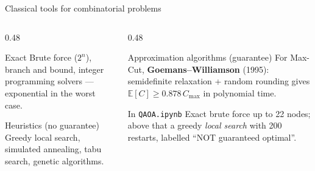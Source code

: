 \documentclass[aspectratio=169,11pt]{beamer}
\newcommand{\key}[1]{{\color{qdark}\textbf{#1}}}
\begin{document}
\begin{frame}{Classical tools for combinatorial problems}
  \begin{columns}[T]
    \begin{column}{0.48\textwidth}
      \begin{block}{Exact}
        Brute force ($2^n$), branch and bound, integer programming solvers --- exponential in the worst case.
      \end{block}
      \begin{block}{Heuristics (no guarantee)}
        Greedy local search, simulated annealing, tabu search, genetic algorithms.
      \end{block}
    \end{column}
    \begin{column}{0.48\textwidth}
      \begin{block}{Approximation algorithms (guarantee)}
        For Max-Cut, \key{Goemans--Williamson} (1995): semidefinite relaxation + random rounding gives
        $\mathbb E[C] \ge 0.878\,C_{\max}$ in polynomial time.
      \end{block}
      \begin{exampleblock}{In \texttt{QAOA.ipynb}}
        Exact brute force up to 22 nodes; above that a greedy \emph{local search} with 200 restarts, labelled
        ``NOT guaranteed optimal''.
      \end{exampleblock}
    \end{column}
  \end{columns}
\end{frame}

\end{document}
